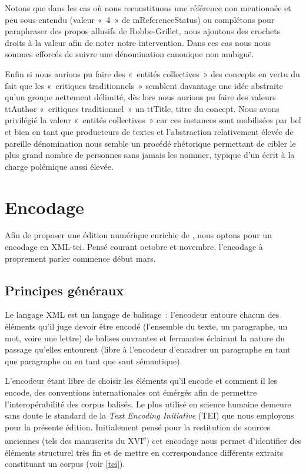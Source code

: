 \documentclass[12pt, a4paper]{article}
\begin{document}
Notons que dans les cas où nous reconstituons une référence non mentionnée et peu sous-entendu (valeur «~4~» de mReferenceStatus) ou complétons pour paraphraser des propos allusifs de Robbe-Grillet, nous ajoutons des crochets droits à la valeur afin de noter notre intervention. Dans ces cas nous nous sommes efforcés de suivre une dénomination canonique non ambiguë.

Enfin si nous aurions pu faire des «~entités collectives~» des concepts en vertu du fait que les «~critiques traditionnels~» semblent davantage une idée abstraite qu'un groupe nettement délimité, dès lors nous aurions pu faire des valeurs ttAuthor «~critiques traditionnel~» un ttTitle, titre du concept. Nous avons privilégié la valeur «~entités collectives~» car ces instances sont mobilisées par \robbe{} bel et bien en tant que producteurs de textes et l'abstraction relativement élevée de pareille dénomination nous semble un procédé rhétorique permettant de cibler le plus grand nombre de personnes sans jamais les nommer, typique d'un écrit à la charge polémique aussi élevée.




\section{Encodage}
Afin de proposer une édition numérique enrichie de \punr, nous optons pour un encodage en XML-tei. Pensé courant octobre et novembre, l'encodage à proprement parler commence début mars.
    \subsection{Principes généraux}
Le langage XML est un langage de balisage~: l'encodeur entoure chacun des éléments qu'il juge devoir être encodé (l'ensemble du texte, un paragraphe, un mot, voire une lettre) de balises ouvrantes et fermantes éclairant la nature du passage qu'elles entourent (libre à l'encodeur d'encadrer un paragraphe en tant que paragraphe ou en tant que saut sémantique).


L'encodeur étant libre de choisir les éléments qu'il encode et comment il les encode, des conventions internationales ont émérgés afin de permettre l'interopérabilité des corpus balisés. Le plus utilisé en science humaine demeure sans doute le standard de la \textit{Text Encoding Initiative} (TEI) que nous employons pour la présente édition. Initialement pensé pour la restitution de sources anciennes (tels des manuscrits du \textsc{XVI}\textsuperscript{e}) cet encodage nous permet d'identifier des éléments structurel très fin et de mettre en correspondance différents extraits constituant un corpus (voir \ref{tei}).
\end{document}
